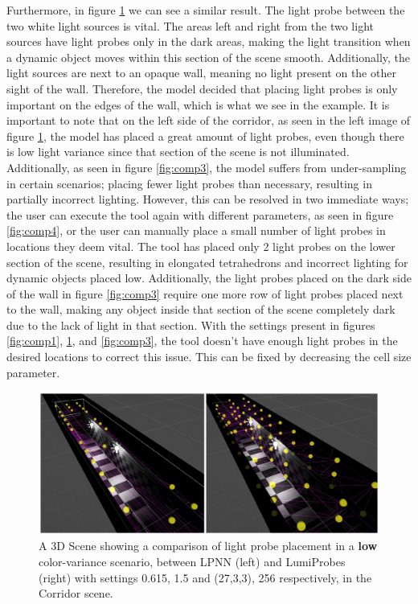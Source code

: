 Furthermore, in figure \ref{fig:comp2} we can see a similar result. The light probe between the two white light sources is vital. The areas left and right from the two light sources have light probes only in the dark areas, making the light transition when a dynamic object moves within this section of the scene smooth. Additionally, the light sources are next to an opaque wall, meaning no light present on the other sight of the wall. Therefore, the model decided that placing light probes is only important on the edges of the wall, which is what we see in the example. It is important to note that on the left side of the corridor, as seen in the left image of figure \ref{fig:comp2}, the model has placed a great amount of light probes, even though there is low light variance since that section of the scene is not illuminated. Additionally, as seen in figure \ref{fig:comp3}, the model suffers from under-sampling in certain scenarios; placing fewer light probes than necessary, resulting in partially incorrect lighting. However, this can be resolved in two immediate ways; the user can execute the tool again with different parameters, as seen in figure \ref{fig:comp4}, or the user can manually place a small number of light probes in locations they deem vital. The tool has placed only 2 light probes on the lower section of the scene, resulting in elongated tetrahedrons and incorrect lighting for dynamic objects placed low. Additionally, the light probes placed on the dark side of the wall in figure \ref{fig:comp3} require one more row of light probes placed next to the wall, making any object inside that section of the scene completely dark due to the lack of light in that section. With the settings present in figures \ref{fig:comp1}, \ref{fig:comp2}, and \ref{fig:comp3}, the tool doesn't have enough light probes in the desired locations to correct this issue. This can be fixed by decreasing the cell size parameter.

\begin{figure}[h]
	\centering
	\includegraphics[scale=0.25]{Graphics/results/concats/comparison2.png}
	\caption{A 3D Scene showing a comparison of light probe placement in a \textbf{low} color-variance scenario, between LPNN (left) and LumiProbes (right) with settings 0.615, 1.5 and (27,3,3), 256 respectively, in the Corridor scene.}
	\label{fig:comp2}
\end{figure}

